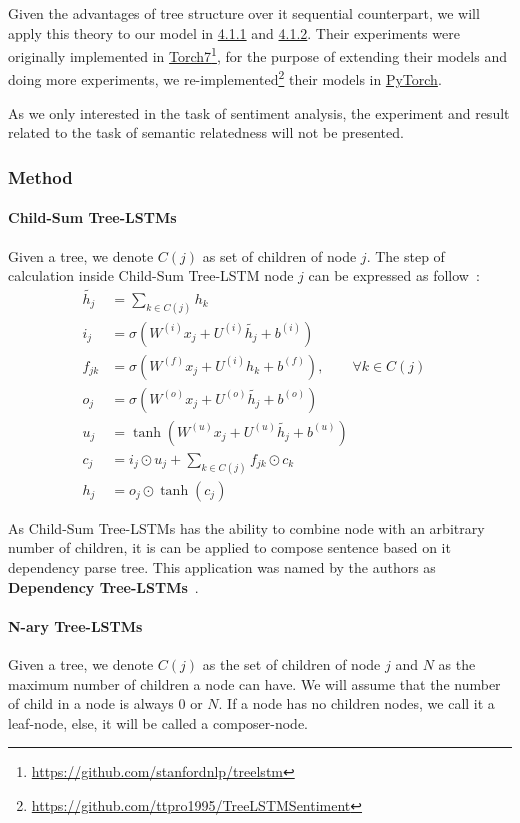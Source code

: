 Given the advantages of tree structure over it sequential counterpart, we will apply this theory to our model in \hyperref[sec:VTtree]{4.1.1} and \hyperref[sec:CNNtree]{4.1.2}.
Their experiments were originally implemented in \hyperref[sec:torch]{Torch7}\footnote{\url{https://github.com/stanfordnlp/treelstm}}, for the purpose of extending their models and doing more experiments, we re-implemented\footnote{\url{https://github.com/ttpro1995/TreeLSTMSentiment}} their models in \hyperref[sec:pytorch]{PyTorch}.

As we only interested in the task of sentiment analysis, the experiment and result related to the task of semantic relatedness will not be presented.

\subsubsection{Method}
\paragraph{Child-Sum Tree-LSTMs}
Given a tree, we denote \(C(j)\) as set of children of node \(j\).
The step of calculation inside Child-Sum Tree-LSTM node \(j\) can be expressed as follow~\cite{treeLSTM}:
\begin{align}
      \tilde{h_j} &= \sum_{k \in C(j)} h_k &\label{eq1:2}\\
      i_j &= \sigma{(W^{(i)}x_j + U^{(i)}\tilde{h_j} + b^{(i)})} &\label{eq1:3}\\
      f_{jk} &= \sigma{(W^{(f)}x_j + U^{(i)}h_k + b^{(f)})}, \qquad  \forall k \in C(j) & \label{eq1:foget1}\\
      o_j &= \sigma{(W^{(o)}x_j + U^{(o)}\tilde{h_j} + b^{(o)})} &\label{eq1:5}\\
      u_j &= \tanh{(W^{(u)}x_j + U^{(u)}\tilde{h_j} + b^{(u)})} &\label{eq1:6}\\
       c_j &= i_j \odot u_j + \sum_{k \in C(j)} f_{jk} \odot c_k & \\
    h_j &= o_j \odot \tanh{(c_j)} &
\end{align}

As Child-Sum Tree-LSTMs has the ability to combine node with an arbitrary number of children, it is can be applied to compose sentence based on it dependency parse tree.
This application was named by the authors as \textbf{Dependency Tree-LSTMs}~\cite{treeLSTM}.

\paragraph{N-ary Tree-LSTMs}
Given a tree, we denote \(C(j)\) as the set of children of node \(j\) and \(N\) as the maximum number of children a node can have.
We will assume that the number of child in a node is always \(0\) or \(N\).
If a node has no children nodes, we call it a leaf-node, else, it will be called a composer-node.

